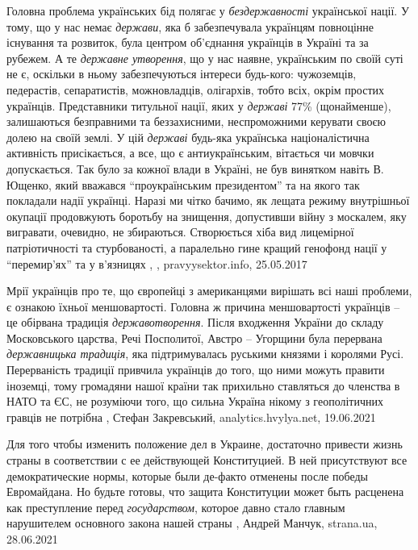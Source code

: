 Головна проблема українських бід полягає у \emph{бездержавності} української нації. У
тому, що у нас немає \emph{держави}, яка б забезпечувала українцям повноцінне
існування та розвиток, була центром об'єднання українців в Україні та за
рубежем. А те \emph{державне утворення}, що у нас наявне, українським по своїй суті не
є, оскільки в ньому забезпечуються інтереси будь-кого: чужоземців, педерастів,
сепаратистів, можновладців, олігархів, тобто всіх, окрім простих українців.
Представники титульної нації, яких у \emph{державі} 77\% (щонайменше), залишаються
безправними та беззахисними, неспроможними керувати своєю долею на своїй землі.
У цій \emph{державі} будь-яка українська націоналістична активність присікається, а
все, що є антиукраїнським, вітається чи мовчки допускається. Так було за кожної
влади в Україні, не був винятком навіть В. Ющенко, який вважався
\enquote{проукраїнським президентом} та на якого так покладали надії українці. Наразі
ми чітко бачимо, як лещата режиму внутрішньої окупації продовжують боротьбу на
знищення, допустивши війну з москалем, яку вигравати, очевидно, не збираються.
Створюється хіба вид лицемірної патріотичності та стурбованості, а паралельно
гине кращий генофонд нації у \enquote{перемир'ях} та у в'язницях
, 
, pravyysektor.info, 25.05.2017

Мрії українців про те, що європейці з американцями вирішать всі наші проблеми,
є ознакою їхньої меншовартості. Головна ж причина меншовартості українців – це
обірвана традиція \emph{державотворення}. Після входження України до складу
Московського царства, Речі Посполитої, Австро – Угорщини була перервана
\emph{державницька традиція}, яка підтримувалась руськими князями і королями Русі.
Перерваність традиції привчила українців до того, що ними можуть правити
іноземці, тому громадяни нашої країни так прихильно ставляться до членства в
НАТО та ЄС, не розуміючи того, що сильна Україна нікому з геополітичних гравців
не потрібна
, Стефан Закревський, 
analytics.hvylya.net, 19.06.2021


Для того чтобы изменить положение дел в Украине, достаточно привести жизнь
страны в соответствии с ее действующей Конституцией. В ней присутствуют все
демократические нормы, которые были де-факто отменены после победы Евромайдана.
Но будьте готовы, что защита Конституции может быть расценена как преступление
перед \emph{государством}, которое давно стало главным нарушителем основного закона
нашей страны
, 
Андрей Манчук, strana.ua, 28.06.2021


